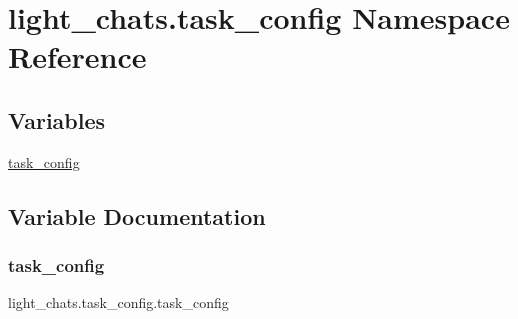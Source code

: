 \hypertarget{namespacelight__chats_1_1task__config}{}\section{light\+\_\+chats.\+task\+\_\+config Namespace Reference}
\label{namespacelight__chats_1_1task__config}
\subsection*{Variables}
\begin{DoxyCompactItemize}
\item 
\hyperlink{namespacelight__chats_1_1task__config_a96e7659d07c3ce042a9c4a275af26778}{task\+\_\+config}
\end{DoxyCompactItemize}


\subsection{Variable Documentation}
\mbox{\label{namespacelight__chats_1_1task__config_a96e7659d07c3ce042a9c4a275af26778}} 
\subsubsection{\texorpdfstring{task\+\_\+config}{task\_config}}
{\footnotesize\ttfamily light\+\_\+chats.\+task\+\_\+config.\+task\+\_\+config}

